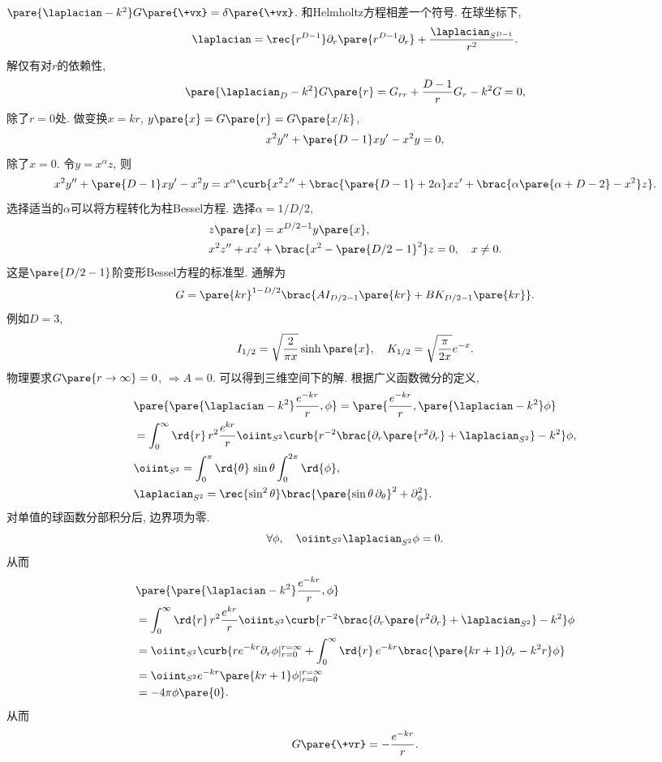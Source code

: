 \documentclass[hidelinks]{ctexart}
\begin{document}
\newpoint{}$\pare{\laplacian - k^2} G\pare{\+vx} = \delta\pare{\+vx}$.
\newpoint{}和Helmholtz方程相差一个符号.
\newpoint{}在球坐标下,
\[ \laplacian = \rec{r^{D-1}}\partial_r\pare{r^{D-1}\partial_r} + \frac{\laplacian_{S^{D-1}}}{r^2}. \]
\newpoint{}解仅有对$r$的依赖性,
\[ \pare{\laplacian_D - k^2} G\pare{r} = G_{rr} + \frac{D-1}{r} G_r - k^2G = 0, \]
除了$r=0$处.
\newpoint{}做变换$x=kr$, $y\pare{x} = G\pare{r} = G\pare{x/k}$,
\[ x^2 y'' + \pare{D-1}xy' - x^2y = 0, \]
除了$x=0$.
\newpoint{}令$y=x^\alpha z$, 则
\[ x^2y'' + \pare{D-1}xy' - x^2y = x^\alpha\curb{x^2z'' + \brac{\pare{D-1}+2\alpha}xz' + \brac{\alpha\pare{\alpha+D-2}-x^2}z}. \]
选择适当的$\alpha$可以将方程转化为柱Bessel方程.
\newpoint{}选择$\alpha = 1/D/2$,
\begin{align*}
    & z\pare{x} = x^{D/2-1}y\pare{x}, \\
    & x^2z'' + xz' + \brac{x^2 - \pare{D/2-1}^2}z = 0,\quad x\neq 0.
\end{align*}
这是$\pare{D/2-1}$阶变形Bessel方程的标准型.
\newpoint{}通解为
\[ G = \pare{kr}^{1-D/2}\brac{AI_{D/2-1}\pare{kr} + BK_{D/2-1}\pare{kr}}. \]
\newpoint{}例如$D=3$,
\[ I_{1/2} = \sqrt{\frac{2}{\pi x}}\sinh \pare{x},\quad K_{1/2} = \sqrt{\frac{\pi}{2x}}e^{-x}. \]
物理要求$G\pare{r\rightarrow \infty} = 0$, $\Rightarrow A=0$. 可以得到三维空间下的解.
\newpoint{}根据广义函数微分的定义,
\begin{align*}
    & \pare{\pare{\laplacian - k^2}\frac{e^{-kr}}{r},\phi} = \pare{\frac{e^{-kr}}{r},\pare{\laplacian - k^2}\phi} \\
    &= \int_0^\infty \rd{r}\, r^2 \frac{e^{kr}}{r}\oiint_{S^2} \curb{r^{-2}\brac{\partial_r \pare{r^2\partial_r} + \laplacian_{S^2}} - k^2}\phi, \\
    & \oiint_{S^2} = \int_0^\pi \rd{\theta}\,\sin\theta\int_0^{2\pi}\rd{\phi},\\
    & \laplacian_{S^2} = \rec{\sin^2\theta}\brac{\pare{\sin \theta\,\partial_\theta}^2 + \partial_\phi^2}.
\end{align*}
对单值的球函数分部积分后, 边界项为零.
\[ \forall \phi,\quad \oiint_{S^2}\laplacian_{S^2}\phi = 0. \]
从而
\begin{align*}
    &\pare{\pare{\laplacian - k^2}\frac{e^{-kr}}{r},\phi} \\
    &= \int_0^\infty \rd{r}\, r^2 \frac{e^{kr}}{r}\oiint_{S^2} \curb{r^{-2}\brac{\partial_r \pare{r^2\partial_r} + \laplacian_{S^2}} - k^2}\phi \\
    &= \oiint_{S^2} \curb{re^{-kr} \partial_r \phi \vert_{r=0}^{r=\infty} + \int_0^\infty\rd{r}\, e^{-kr}\brac{\pare{kr+1}\partial_r - k^2 r}\phi} \\
    &= \oiint_{S^2} e^{-kr}\pare{kr+1}\phi\vert_{r=0}^{r=\infty} \\
    &= -4\pi \phi\pare{0}.
\end{align*}
从而
\[ G\pare{\+vr} = -\frac{e^{-kr}}{r}. \]
\end{document}

